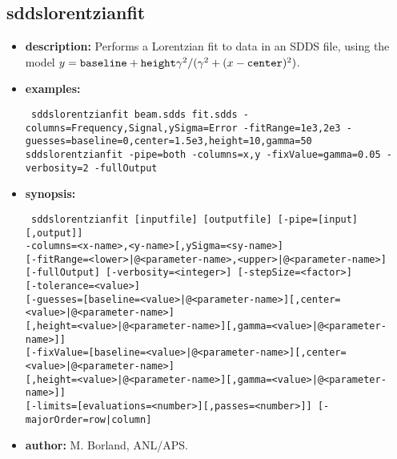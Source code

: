 %
\newpage
\subsection{sddslorentzianfit}
\label{sddslorentzianfit}

\begin{itemize}
\item {\bf description:} Performs a Lorentzian fit to data in an SDDS file, using
  the model $y = \verb|baseline| + \verb|height| \gamma^2 /(\gamma^2 + (x - \verb|center|)^2)$.
\item {\bf examples:}
\begin{flushleft}{\tt
sddslorentzianfit beam.sdds fit.sdds -columns=Frequency,Signal,ySigma=Error -fitRange=1e3,2e3 -guesses=baseline=0,center=1.5e3,height=10,gamma=50\\
sddslorentzianfit -pipe=both -columns=x,y -fixValue=gamma=0.05 -verbosity=2 -fullOutput
}\end{flushleft}
\item {\bf synopsis:}
\begin{flushleft}{\tt
  sddslorentzianfit [inputfile] [outputfile] [-pipe=[input][,output]]\\
  -columns=<x-name>,<y-name>[,ySigma=<sy-name>]\\
  {}[-fitRange=<lower>|@<parameter-name>,<upper>|@<parameter-name>]\\
  {}[-fullOutput] [-verbosity=<integer>] [-stepSize=<factor>]\\
  {}[-tolerance=<value>]\\
  {}[-guesses=[baseline=<value>|@<parameter-name>][,center=<value>|@<parameter-name>]\\
           {}[,height=<value>|@<parameter-name>][,gamma=<value>|@<parameter-name>]]\\
  {}[-fixValue=[baseline=<value>|@<parameter-name>][,center=<value>|@<parameter-name>]\\
            {}[,height=<value>|@<parameter-name>][,gamma=<value>|@<parameter-name>]]\\
  {}[-limits=[evaluations=<number>][,passes=<number>]] [-majorOrder=row|column]
}\end{flushleft}
\item {\bf author:} M. Borland, ANL/APS.
\end{itemize}
